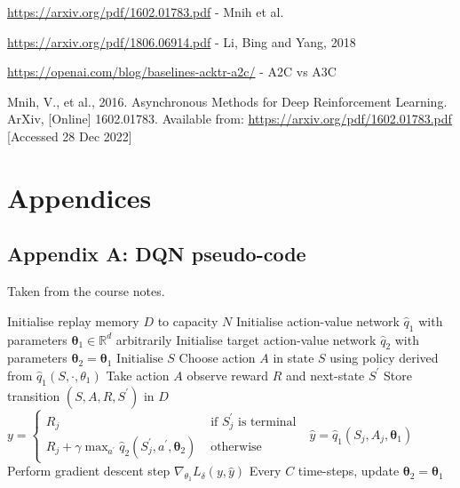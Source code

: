 \documentclass{article}
\begin{document}
\url{https://arxiv.org/pdf/1602.01783.pdf} - Mnih et al.

\url{https://arxiv.org/pdf/1806.06914.pdf} - Li, Bing and Yang, 2018

\url{https://openai.com/blog/baselines-acktr-a2c/} - A2C vs A3C

\small

Mnih, V., et al., 2016. Asynchronous Methods for Deep Reinforcement Learning. ArXiv, [Online] 1602.01783.
Available from: \url{https://arxiv.org/pdf/1602.01783.pdf} [Accessed 28 Dec 2022]

\normalsize
\newpage
\section*{Appendices}
\subsection*{Appendix A: DQN pseudo-code}
\label{dqn_pseudo}
Taken from the course notes.
\begin{algorithmic}[1]
\State Initialise replay memory $D$ to capacity $N$
\State Initialise action-value network $\hat{q}_{1}$ with parameters $\boldsymbol{\theta}_{1} \in \mathbb{R}^{d}$ arbitrarily
\State Initialise target action-value network $\hat{q}_{2}$ with parameters $\boldsymbol{\theta}_{2}=\boldsymbol{\theta}_{1}$
    \State $\text{Initialise } S$
        \State Choose action $A$ in state $S$ using policy derived from  $\hat{q}_{1}\left(S, \cdot, \theta_{1}\right)$
        \State Take action $A$ observe reward $R$ and next-state $S^{\prime}$
        \State Store transition $\left(S, A, R, S^{\prime}\right)$ in $D$
            \State $y= \begin{cases}R_{j} & \text { if } S_{j}^{\prime} \text { is terminal } \\ R_{j}+\gamma \max _{a^{\prime}} \hat{q}_{2}\left(S_{j}^{\prime}, a^{\prime}, \boldsymbol{\theta}_{2}\right) & \text { otherwise }\end{cases}$
            \State $\hat{y}=\hat{q}_{1}\left(S_{j}, A_{j}, \boldsymbol{\theta}_{1}\right)$
            \State Perform gradient descent step $\nabla_{\theta_{1}} L_{\delta}(y, \hat{y})$
        \EndFor
    \State Every $C$ time-steps, update $\boldsymbol{\theta}_{2}=\boldsymbol{\theta}_{1}$
    \EndFor
\EndFor
\end{algorithmic}
\end{document}
